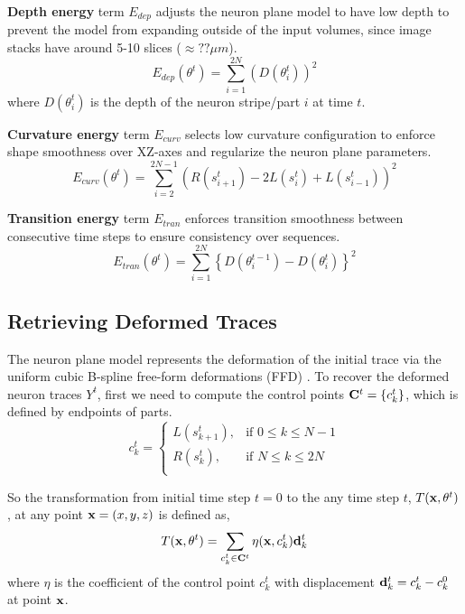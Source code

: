 \documentclass{article}
\begin{document}
\textbf{Depth energy} term $E_{dep}$ adjusts the neuron plane model to have low depth to prevent the model from expanding outside of the input volumes, since image stacks have around 5-10 slices ($\approx ?? \mu m$). %
\begin{equation}
E_{dep}(\theta^t) = \sum_{i=1}^{2N} \left( D(\theta_i^t) \right)^2
\end{equation} 
where $D(\theta_i^t)$ is the depth of the neuron stripe/part $i$ at time $t$.

\textbf{Curvature energy} term $E_{curv}$ selects low curvature configuration to enforce shape smoothness over XZ-axes and regularize the neuron plane parameters.
\begin{equation}
E_{curv}(\theta^t) = \sum_{i=2}^{2N-1} (R(s_{i+1}^t) - 2L(s_i^t) + L(s_{i-1}^t))^2
\end{equation} 

\textbf{Transition energy} term $E_{tran}$ enforces transition smoothness between consecutive time steps to ensure consistency over sequences.
\begin{equation}
E_{tran}(\theta^t) = \sum_{i=1}^{2N} \left\{ D(\theta_i^{t-1}) - D(\theta_i^t) \right\}^2
\end{equation}


\subsection{Retrieving Deformed Traces} \label{sec:gettrace}
The neuron plane model represents the deformation of the initial trace via the uniform cubic B-spline
free-form deformations (FFD) \cite{Rueckert1999}. To recover the deformed neuron traces $Y^t$, first we need to compute the control points ${\bf C}^t = \{c_k^t\}$, which is defined by endpoints of parts.
\begin{equation}
c_k^t = 
\begin{cases}
L(s_{k+1}^t), & \text{if } 0 \leq k \leq N-1 \\
R(s_k^t), & \text{if } N \leq k \leq 2N \\
\end{cases}
\end{equation}

So the transformation from initial time step $t=0$ to the any time step $t$, $T({\bf x}, \theta^t)$, at any point ${\bf x} = (x,y,z)$ is defined as,
\begin{equation}
T({\bf x}, \theta^t) = \sum_{c_k^t \in {\bf C}^t} \eta({\bf x}, c_k^t) {\bf d}_k^t
\end{equation}
where $\eta$ is the coefficient of the control point $c_k^t$ with displacement ${\bf d}_k^t = c_k^t - c_k^0$ at point ${\bf x}$.
\end{document}
